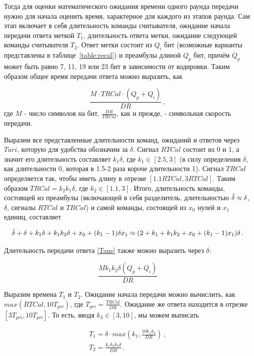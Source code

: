 \documentclass[12pt]{article}
\theoremstyle{definition}
\begin{document}
Тогда для оценки математического ожидания времени одного раунда передачи нужно для начала оценить время, характерное для каждого из этапов раунда. Сам этап включает в себя длительность команды считывателя, ожидание начала передачи ответа меткой $T_1$, длительность ответа метки, ожидание следующей команды считывателя $T_2$. Ответ метки состоит из $Q_i$ бит (возможные варианты представлены в таблице~\ref{table:recal}) и преамбулы длиной $Q_p$ бит, причём $Q_p$ может быть равно 7, 11, 19 или 23 бит в зависимости от кодировки. Таким образом общее время передачи ответа можно выразить, как

\begin{equation}
\label{Tans}
    \frac{M\cdot TRCal\cdot(Q_p+Q_i)}{DR}\,,
\end{equation}
где $M$ - число символов на бит, $\frac{DR}{TRCal}$, как и прежде, - символьная скорость передачи.

Выразим все представленные длительности команд, ожиданий и ответов через $Tari$, которую для удобства обозначим за $\delta$. Сигнал $RTCal$ состоит из 0 и 1, а значит его длительность составляет $k_1\delta$, где $k_1\in[2.5,3]$ (в силу определения $\delta$, как длительности 0, которая в 1.5-2 раза короче длительности 1). Сигнал $TRCal$ определяется так, чтобы иметь длину в отрезке $[1.1RTCal,3RTCal]$. Таким образом $TRCal = k_2k_1\delta$, где $k_2\in[1.1,3]$. Итого, длительность команды, состоящей из преамбулы (включающей в себя разделитель, длительностью $\Tilde{\delta}\approx\delta$, $\delta$, сигналы $RTCal$ и $TRCal$) и самой команды, состоящей из $x_0$ нулей и $x_1$ единиц, составляет

\begin{equation}
    \Tilde{\delta}+\delta+k_1\delta+k_1k_2\delta+x_0+(k_1-1)\delta x_1 \approx (2+k_1+k_1k_2+x_0+(k_1-1)x_1)\delta\,.
\end{equation}

Длительность передачи ответа \eqref{Tans} также можно выразить через $\delta$:

\begin{equation}
    \frac{Mk_1k_2\delta(Q_p+Q_i)}{DR}
\end{equation}

Выразим времена $T_1$ и $T_2$. Ожидание начала передачи можно вычислить, как $max(RTCal,10T_{pri})$, где $T_{pri}=\frac{TRCal}{DR}$. Ожидание же ответа находится в отрезке $[3T_{pri},10T_{pri}]$. То есть, вводя $k_3\in[3,10]$, мы можем выписать

\begin{equation}
    \begin{gathered}
        T_1 = \delta\cdot max(k_1,\frac{10k_1k_2}{DR})\,, \\
        T_2 = \frac{k_1k_2k_3\delta}{DR}\,.
    \end{gathered}
\end{equation}
\end{document}
